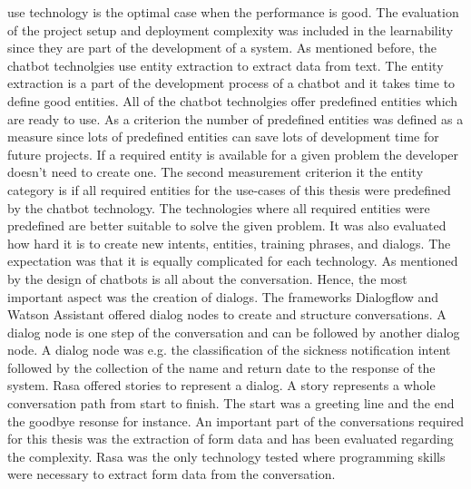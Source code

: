 use technology is the optimal case when the performance is good.
The evaluation of the project setup and deployment complexity was included in 
the learnability since they are part of the development of a system.
As mentioned before, the chatbot technolgies use entity extraction to 
extract data from text.
The entity extraction is a part of the development process of a chatbot
and it takes time to define good entities.
All of the chatbot technolgies offer predefined entities which are ready to use.
As a criterion the number of predefined entities was defined as a measure since 
lots of predefined entities can save lots of development time for future projects.
If a required entity is available for a given problem the developer doesn't need 
to create one.
The second measurement criterion it the entity category is if all required 
entities for the use-cases of this thesis were predefined by the chatbot technology.
The technologies where all required entities were predefined are better suitable 
to solve the given problem.
It was also evaluated how hard it is to create new intents, entities, training phrases,
and dialogs.
The expectation was that it is equally complicated for each technology.
As mentioned by \citet{folstad2017chatbots} the design of chatbots is all about the
conversation.
Hence, the most important aspect was the creation of dialogs.
The frameworks Dialogflow and Watson Assistant offered dialog nodes 
to create and structure conversations.
A dialog node is one step of the conversation and can be followed by another 
dialog node.
A dialog node was e.g. the classification of the sickness notification intent
followed by the collection of the name and return date to the response of the system.
Rasa offered stories to represent a dialog.
A story represents a whole conversation path from start to finish.
The start was a greeting line and the end the goodbye resonse for instance.
An important part of the conversations required for this thesis was the 
extraction of form data and has been evaluated regarding the 
complexity.
Rasa was the only technology tested where programming skills were necessary to
extract form data from the conversation. 






